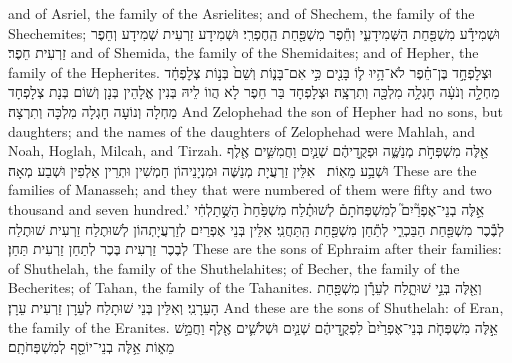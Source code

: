 {and of Asriel, the family of the Asrielites; and of Shechem, the family of the Shechemites;}{}
{וּשְׁמִידָ֕ע מִשְׁפַּ֖חַת הַשְּׁמִידָעִ֑י וְחֵ֕פֶר מִשְׁפַּ֖חַת הַֽחֶפְרִֽי׃}
{וּשְׁמִידָע זַרְעִית שְׁמִידָע וְחֵפֶר זַרְעִית חֵפֶר׃}
{and of Shemida, the family of the Shemidaites; and of Hepher, the family of the Hepherites.}{}
{וּצְלׇפְחָ֣ד בֶּן־חֵ֗פֶר לֹא־הָ֥יוּ ל֛וֹ בָּנִ֖ים כִּ֣י אִם־בָּנ֑וֹת וְשֵׁם֙ בְּנ֣וֹת צְלׇפְחָ֔ד מַחְלָ֣ה וְנֹעָ֔ה חׇגְלָ֥ה מִלְכָּ֖ה וְתִרְצָֽה׃}
{וּצְלָפְחָד בַּר חֵפֶר לָא הֲווֹ לֵיהּ בְּנִין אֱלָהֵין בְּנָן וְשׁוֹם בְּנָת צְלָפְחָד מַחְלָה וְנוֹעָה חָגְלָה מִלְכָּה וְתִרְצָה׃}
{And Zelophehad the son of Hepher had no sons, but daughters; and the names of the daughters of Zelophehad were Mahlah, and Noah, Hoglah, Milcah, and Tirzah.}{}
{אֵ֖לֶּה מִשְׁפְּחֹ֣ת מְנַשֶּׁ֑ה וּפְקֻ֣דֵיהֶ֔ם שְׁנַ֧יִם וַחֲמִשִּׁ֛ים אֶ֖לֶף וּשְׁבַ֥ע מֵאֽוֹת׃ \setuma }
{אִלֵּין זַרְעֲיָת מְנַשֶּׁה וּמִנְיָנֵיהוֹן חַמְשִׁין וּתְרֵין אַלְפִין וּשְׁבַע מְאָה׃}
{These are the families of Manasseh; and they that were numbered of them were fifty and two thousand and seven hundred.’}{}
{אֵ֣לֶּה בְנֵי־אֶפְרַ֘יִם֮ לְמִשְׁפְּחֹתָם֒ לְשׁוּתֶ֗לַח מִשְׁפַּ֙חַת֙ הַשֻּׁ֣תַלְחִ֔י לְבֶ֕כֶר מִשְׁפַּ֖חַת הַבַּכְרִ֑י לְתַ֕חַן מִשְׁפַּ֖חַת הַֽתַּחֲנִֽי׃}
{אִלֵּין בְּנֵי אֶפְרַיִם לְזַרְעֲיָתְהוֹן לְשׁוּתֶלַח זַרְעִית שׁוּתֶלַח לְבֶכֶר זַרְעִית בֶּכֶר לְתַחַן זַרְעִית תַּחַן׃}
{These are the sons of Ephraim after their families: of Shuthelah, the family of the Shuthelahites; of Becher, the family of the Becherites; of Tahan, the family of the Tahanites.}{}
{וְאֵ֖לֶּה בְּנֵ֣י שׁוּתָ֑לַח לְעֵרָ֕ן מִשְׁפַּ֖חַת הָעֵרָנִֽי׃
}
{וְאִלֵּין בְּנֵי שׁוּתָלַח לְעֵרָן זַרְעִית עֵרָן׃}
{And these are the sons of Shuthelah: of Eran, the family of the Eranites.}{}
{אֵ֣לֶּה מִשְׁפְּחֹ֤ת בְּנֵי־אֶפְרַ֙יִם֙ לִפְקֻ֣דֵיהֶ֔ם שְׁנַ֧יִם וּשְׁלֹשִׁ֛ים אֶ֖לֶף וַחֲמֵ֣שׁ מֵא֑וֹת אֵ֥לֶּה בְנֵי־יוֹסֵ֖ף לְמִשְׁפְּחֹתָֽם׃ \setuma }
